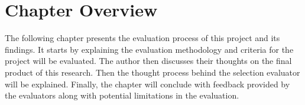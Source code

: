 \section{Chapter Overview}

The following chapter presents the evaluation process of this project and its findings. It starts by explaining the evaluation methodology and criteria for the project will be evaluated. The author then discusses their thoughts on the final product of this research. Then the thought process behind the selection evaluator will be explained. Finally, the chapter will conclude with feedback provided by the evaluators along with potential limitations in the evaluation.